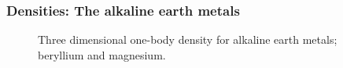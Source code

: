 \begin{frame}
\frametitle{Densities: The alkaline earth metals}
  \begin{figure}
 \begin{center}
  \caption{Three dimensional one-body density for alkaline earth metals; beryllium  and magnesium.}
  \label{fig:OBD_alkaline_Atoms_2D_combo}
 \end{center}
\end{figure}
\end{frame}

